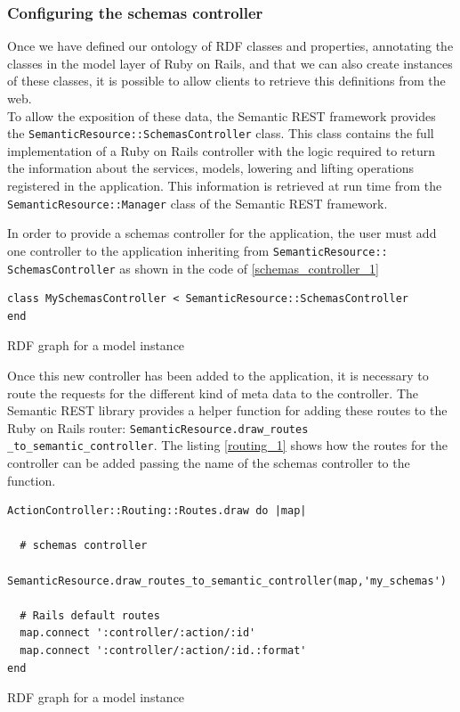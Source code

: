 \subsubsection{Configuring the schemas controller}
Once we have defined our ontology of RDF classes and properties, annotating the classes in the model layer of Ruby on
Rails, and that we can also create instances of these classes, it is possible to allow clients to retrieve this
definitions from the web.\\
To allow the exposition of these data, the Semantic REST framework provides the
\texttt{SemanticResource::SchemasController} class. 
This class contains the full implementation of a Ruby on Rails controller with the logic required to return the
information about the services, models, lowering and lifting operations registered in the application. This information
is retrieved at run time from the \texttt{SemanticResource::Manager} class of the Semantic REST framework.

In order to provide a schemas controller for the application, the user must add one controller to the application
inheriting from \texttt{SemanticResource:: SchemasController} as shown in the code of \ref{schemas_controller_1}

\begin{table}
\vspace{5 mm}
\begin{lstlisting}
class MySchemasController < SemanticResource::SchemasController
end
\end{lstlisting} 
\vspace{5 mm}
\caption{RDF graph for a model instance}
\label{schemas_controller_1}
\end{table}

Once this new controller has been added to the application, it is necessary to route the requests for the different kind
of meta data to the controller. The Semantic REST library provides a helper function for adding these routes to the Ruby
on Rails router: \texttt{SemanticResource.draw\_routes \_to\_semantic\_controller}. The listing \ref{routing_1} shows
how the routes for the controller can be added passing the name of the schemas controller to the function.

\begin{table}
\vspace{5 mm}
\begin{lstlisting}
ActionController::Routing::Routes.draw do |map|

  # schemas controller
  SemanticResource.draw_routes_to_semantic_controller(map,'my_schemas')

  # Rails default routes
  map.connect ':controller/:action/:id'
  map.connect ':controller/:action/:id.:format'
end
\end{lstlisting} 
\vspace{5 mm}
\caption{RDF graph for a model instance}
\label{routing_1}
\end{table}

